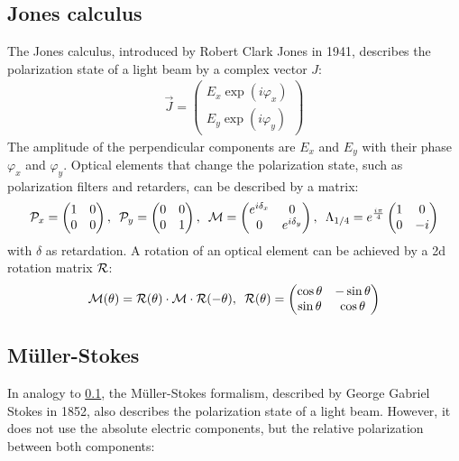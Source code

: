 \subsection{Jones calculus}
\label{sec:jones}
%
The Jones calculus, introduced by Robert Clark Jones in 1941, describes the polarization state of a light beam by a complex vector $J$:
%
\begin{align}
    \vec{J} = \begin{pmatrix} E_x \exp(i \varphi_x) \\ E_y \exp(i \varphi_y) \end{pmatrix}
\end{align}
%
The amplitude of the perpendicular components are $E_x$ and $E_y$ with their phase $\varphi_x$ and $\varphi_y$.
Optical elements that change the polarization state, such as polarization filters and retarders, can be described by a matrix:
%
\begin{align}
\begin{split}
\mathcal{P}_x =
\begin{pmatrix}
1 & 0 \\ 0 & 0
\end{pmatrix}
, \enspace
\mathcal{P}_y =
\begin{pmatrix}
0 & 0 \\ 0 & 1
\end{pmatrix}
, \enspace
\mathcal{M} =
\begin{pmatrix}
e^{i \delta_x} & 0 \\ 0 & e^{i \delta_y}
\end{pmatrix}
, \enspace
\Lambda_{1/4}=
e^{\frac{i \pi}{4}}
\begin{pmatrix}
1 & 0 \\ 0 & -i
\end{pmatrix}
\end{split}
\end{align}
%
with $\delta$ as retardation.
A rotation of an optical element can be achieved by a 2d rotation matrix $\mathcal{R}$:
%
\begin{align}
\begin{split}
\mathcal{M}(\theta )=\mathcal{R}(\theta )\cdot\mathcal{M}\cdot\mathcal{R}(-\theta )
, \enspace
\mathcal{R}(\theta ) =
\begin{pmatrix}
\cos \theta & -\sin \theta \\
\sin \theta & \cos \theta
\end{pmatrix}
\end{split}
\label{eq::JonesRotation}
\end{align}
%
%
%
\subsection{M{\"u}ller-Stokes}\label{sec:Mueller-Stokes}
\label{sec:mueller_stokes}
%
In analogy to \cref{sec:jones}, the M{\"u}ller-Stokes formalism, described by George Gabriel Stokes in 1852, also describes the polarization state of a light beam.
However, it does not use the absolute electric components, but the relative polarization between both components:
%
